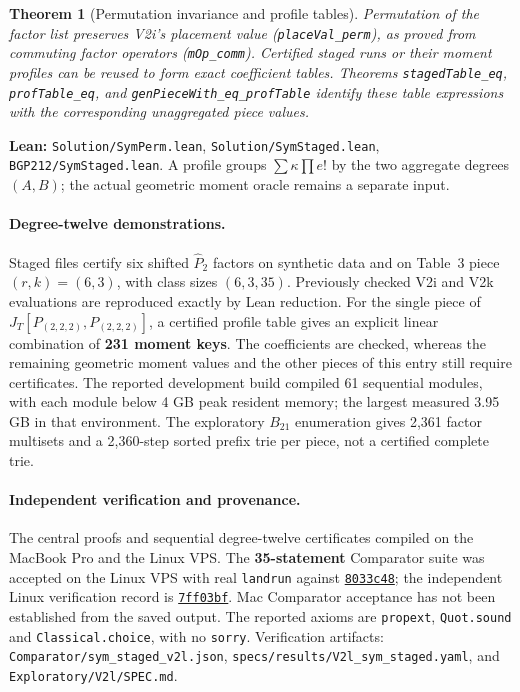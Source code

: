 \documentclass[11pt]{article}
\newtheorem{theorem}{Theorem}[section]
\newcommand{\code}[1]{\texttt{#1}}
\begin{document}
\begin{theorem}[Permutation invariance and profile tables]\label{thm:v2l-profile}
Permutation of the factor list preserves V2i's placement value
(\code{placeVal\_perm}), as proved from commuting factor operators
(\code{mOp\_comm}). Certified staged runs or their moment profiles can
be reused to form exact coefficient tables. Theorems \code{stagedTable\_eq},
\code{profTable\_eq}, and \code{genPieceWith\_eq\_profTable} identify
these table expressions with the corresponding unaggregated piece values.
\end{theorem}
\noindent\textbf{Lean:} \nolinkurl{Solution/SymPerm.lean},
\nolinkurl{Solution/SymStaged.lean},
\nolinkurl{BGP212/SymStaged.lean}.
A profile groups $\sum\kappa\prod e!$ by the two aggregate degrees
$(A,B)$; the actual geometric moment oracle remains a separate input.

\paragraph{Degree-twelve demonstrations.}
Staged files certify six shifted $\widehat P_2$ factors on synthetic data
and on Table~3 piece $(r,k)=(6,3)$, with class sizes $(6,3,35)$.
Previously checked V2i and V2k evaluations are reproduced exactly by
Lean reduction. For the single piece of
$J_T[P_{(2,2,2)},P_{(2,2,2)}]$, a certified profile table gives an
explicit linear combination of \textbf{231 moment keys}. The coefficients
are checked, whereas the remaining geometric moment values and the other
pieces of this entry still require certificates. The reported development
build compiled 61 sequential modules, with each module below 4 GB peak
resident memory; the largest measured 3.95 GB in that environment.
The exploratory $B_{21}$ enumeration gives 2,361 factor multisets and a
2,360-step sorted prefix trie per piece, not a certified complete trie.

\paragraph{Independent verification and provenance.}
The central proofs and sequential degree-twelve certificates compiled on the
MacBook Pro and the Linux VPS. The \textbf{35-statement} Comparator suite
was accepted on the Linux VPS with real \code{landrun} against
\href{https://github.com/thinkthoughts/lean-bgp212/commit/8033c48}{\code{8033c48}};
the independent Linux verification record is
\href{https://github.com/thinkthoughts/lean-bgp212/commit/7ff03bf}{\code{7ff03bf}}.
Mac Comparator acceptance has not been established from the saved output.
The reported axioms are \code{propext}, \code{Quot.sound} and
\code{Classical.choice}, with no \code{sorry}.
Verification artifacts: \nolinkurl{Comparator/sym_staged_v2l.json},
\nolinkurl{specs/results/V2l_sym_staged.yaml}, and
\nolinkurl{Exploratory/V2l/SPEC.md}.
\end{document}
